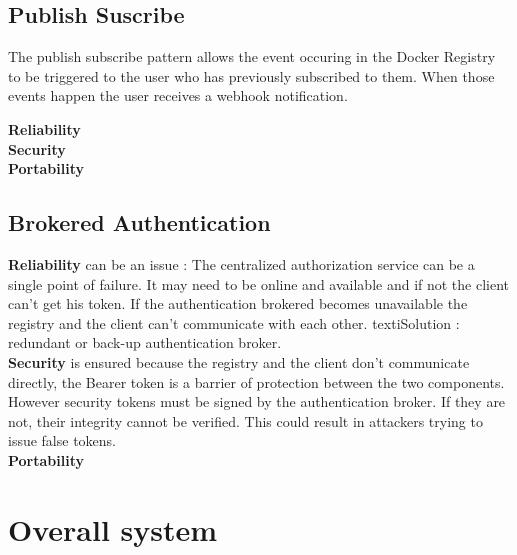 \subsection{Publish Suscribe}

The publish subscribe pattern allows the event occuring in the Docker Registry to be triggered to the user who has previously subscribed to them. When those events happen the user receives a webhook notification.

\textbf{Reliability} \\
\textbf{Security} \\
\textbf{Portability} \\

\subsection{Brokered Authentication}
\textbf{Reliability} can be an issue :
The centralized authorization service can be a single point of failure. It may need to be online and available and if not the client can't get his token. If the authentication brokered becomes unavailable the registry and the client can't communicate with each other.
texti{Solution :} redundant or back-up authentication broker. \\
\textbf{Security} is ensured because the registry and the client don't communicate directly, the Bearer token is a barrier of protection between the two components.\\
However security tokens must be signed by the authentication broker. If they are not, their integrity cannot be verified. This could result in attackers trying to issue false tokens. \\
\textbf{Portability} \\


\section{Overall system}
